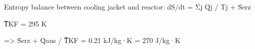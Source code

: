 Entropy balance between cooling jacket and reactor:  
dS/dt = Σj Q̇j / Tj + Ṡerz  

T̅KF = 295 K  

=> Ṡerz + Q̇aus / T̅KF = 0.21 kJ/kg·K = 270 J/kg·K
